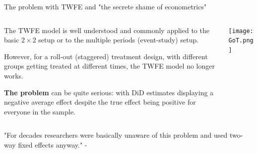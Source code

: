 \documentclass[notes,11pt, aspectratio=169]{beamer}
\newenvironment{wideitemize}{\itemize\addtolength{\itemsep}{10pt}}{\enditemize}
\begin{document}
\begin{frame}{The problem with TWFE and "the secrete shame of econometrics"}
\begin{columns}[T] %
    \begin{column}{0.6\textwidth}
      \begin{wideitemize} 
        \item The TWFE model is well understood and commonly applied to the basic $2\times2$ setup or to the multiple periods (event-study) setup.
        \item However, for a roll-out (staggered) treatment design, with different groups getting treated at different times, the TWFE model no longer works.
        \item \textbf{The problem} can be quite serious: with DiD estimates displaying a negative average effect despite the true effect being positive for everyone in the sample. 
            \end{wideitemize}
    \end{column}%
    \hfill%
    \begin{column}{.4\textwidth}
    \begin{center}
 \texttt{[image: GoT.png]}                 
    \end{center}
    \end{column}
  \end{columns}
  "For decades researchers were basically unaware of this problem and used two-way fixed effects anyway." - \color{gray}{The Effect}
    \end{frame}
\end{document}
